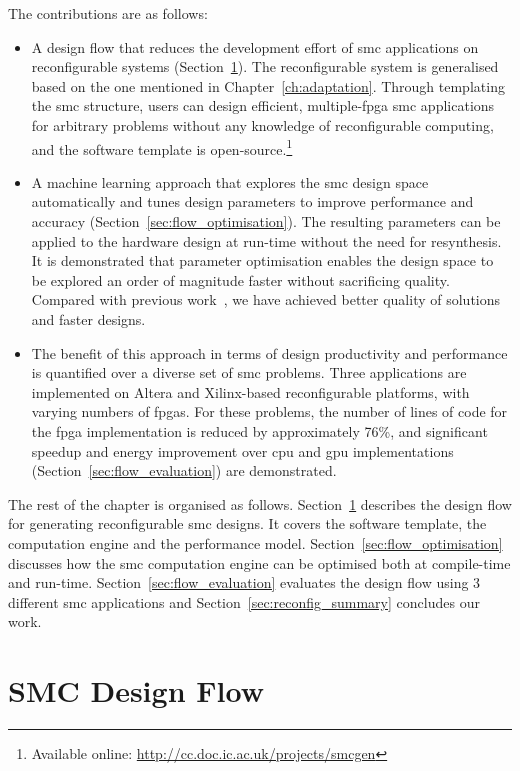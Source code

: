 The contributions are as follows:
\begin{itemize}
\item A design flow that reduces the development effort of \gls{smc} applications on reconfigurable systems (Section~\ref{sec:flow_design}).
The reconfigurable system is generalised based on the one mentioned in Chapter~\ref{ch:adaptation}.
Through templating the \gls{smc} structure, users can design efficient, multiple-\gls{fpga} \gls{smc} applications for arbitrary problems without any knowledge of reconfigurable computing, and the software template is open-source.\footnote{Available online: \url{http://cc.doc.ic.ac.uk/projects/smcgen}}
\item A machine learning approach that explores the \gls{smc} design space automatically and tunes design parameters to improve performance and accuracy (Section~\ref{sec:flow_optimisation}). The resulting parameters can be applied to the hardware design at run-time without the need for resynthesis.
It is demonstrated that parameter optimisation enables the design space to be explored an order of magnitude faster without sacrificing quality.
Compared with previous work~\cite{chau14trets,chau13acm}, we have achieved better quality of solutions and faster designs.
\item The benefit of this approach in terms of design productivity and performance is quantified over a diverse set of \gls{smc} problems.
Three applications are implemented on Altera and Xilinx-based reconfigurable platforms, with varying numbers of \glspl{fpga}. For these problems, the number of lines of code for the \gls{fpga} implementation is reduced by approximately 76\%, and 
significant speedup and energy improvement over \gls{cpu} and \gls{gpu} implementations (Section~\ref{sec:flow_evaluation}) are demonstrated.
\end{itemize}

The rest of the chapter is organised as follows.
Section~\ref{sec:flow_design} describes the design flow for generating reconfigurable \gls{smc} designs.
It covers the software template, the computation engine and the performance model.
Section~\ref{sec:flow_optimisation} discusses how the \gls{smc} computation engine can be optimised both at compile-time and run-time.
Section~\ref{sec:flow_evaluation} evaluates the design flow using 3 different \gls{smc} applications and 
Section~\ref{sec:reconfig_summary} concludes our work.


\section{SMC Design Flow}
\label{sec:flow_design}

